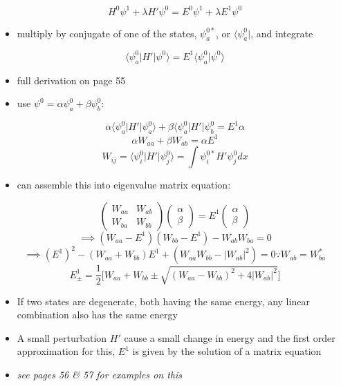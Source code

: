 \documentclass[a4paper,11pt,normalem]{article}
\begin{document}
\[
    H^0 \psi^1 + \lambda H'\psi^0 = E^0 \psi^1 + \lambda E^1 \psi^0
\]

\begin{itemize}
\item
  multiply by conjugate of one of the states, \(\psi_{a}^{0*}\), or
  \(\langle \psi_{a}^0|\), and integrate
\end{itemize}

\[
    \langle \psi_{a}^0 | H' | \psi^0 \rangle  = E^1 \langle \psi_{a}^0 | \psi^0 \rangle
\]

\begin{itemize}
\item
  full derivation on page 55
\item
  use \(\psi^0 = \alpha \psi_{a}^0 + \beta \psi_{b}^0\):
\end{itemize}

\[
    \alpha \langle \psi_{a}^0 | H' | \psi_{a}^0 \rangle + \beta \langle \psi_{a}^0 | H' | \psi_{b}^0 = E^1 \alpha \]
\[
    \alpha W_{aa} + \beta W_{ab} = \alpha E^1 \] \[
    W_{ij} = \langle \psi_{i}^0 | H' | \psi_{j}^0 \rangle = \int \psi_{i}^{0*} H' \psi_{j}^0 dx
\]

\begin{itemize}
\item
  can assemble this into eigenvalue matrix equation:
\end{itemize}

\[
    \begin{pmatrix} W_{aa} & W_{ab} \\ W_{ba} & W_{bb} \end{pmatrix} \begin{pmatrix} \alpha \\ \beta \end{pmatrix} = E^1 \begin{pmatrix} \alpha \\ \beta \end{pmatrix} \]
\[
    \implies (W_{aa} - E^1)(W_{bb} - E^1) - W_{ab}W_{ba} = 0 \] \[
    \implies (E^1)^2 - (W_{aa} + W_{bb})E^1 + (W_{aa}W_{bb} - |W_{ab}|^2) = 0 \because W_{ab} = W_{ba}^* \]
\[
    E_{\pm}^1 = \frac{1}{2} \Bigg[W_{aa} + W_{bb} \pm \sqrt{(W_{aa} - W_{bb})^2 + 4|W_{ab}|^2}\Bigg]
\]

\begin{itemize}
\item
  If two states are degenerate, both having the same energy, any linear
  combination also has the same energy
\item
  A small perturbation \(H'\) cause a small change in energy and the
  first order approximation for this, \(E^1\) is given by the solution
  of a matrix equation
\item
  \emph{see pages 56 \& 57 for examples on this}
\end{itemize}
\end{document}
